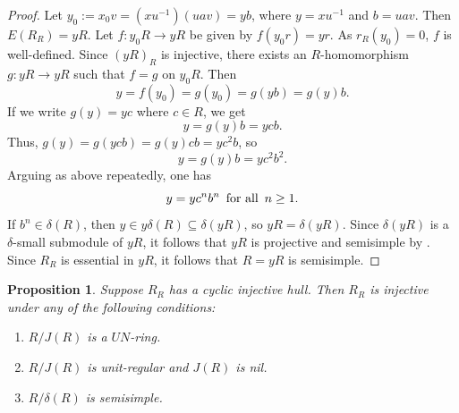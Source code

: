 \documentclass{amsart}
\theoremstyle{plain}
\newtheorem{proposition}[theorem]{Proposition}
\numberwithin{equation}{section}
\begin{document}
\begin{proof}
Let $y_{0}:=x_{0} v =(x u^{ -1}) (u a v) =y b$, where $y =x u^{ -1}$ and $b =u a v$. Then $E (R_{R}) =y R$. Let $f :y_{0} R \rightarrow y R$ be given by $f (y_{0} r) =y r$. As $r_{R} (y_{0}) =0$, $f$ is well-defined. Since $(y R)_{R}$ is injective, there exists an $R$-homomorphism $g :y R \rightarrow y R$ such that $f =g$ on $y_{0} R$. Then
\begin{equation*}y =f (y_{0}) =g (y_{0}) =g (y b) =g (y) b\text{.}
\end{equation*}If we write $g (y) =y c$ where $c \in R$, we get
\begin{equation*}y =g (y) b =y c b\text{.}
\end{equation*}Thus, $g (y) =g (y c b) =g (y) c b =y c^{2} b$, so
\begin{equation*}y =g (y) b =y c^{2} b^{2}\text{.}
\end{equation*}Arguing as above repeatedly, one has
\begin{equation*}y =y c^{n} b^{n}\text{\thinspace \thinspace \thinspace }\text{for all}\text{\thinspace \thinspace \thinspace }n \geq 1.
\end{equation*}If $b^{n} \in \delta  (R)$, then $y \in y \delta  (R) \subseteq \delta  (y R)$, so $y R =\delta  (y R)$. Since $\delta  (y R)$ is a $\delta $-small submodule of $y R$, it follows that $y R$ is projective and semisimple by \cite[Lemma
1.2]{Z}. Since $R_{R}$ is essential in $y R$, it follows that $R =y R$ is semisimple. 
\end{proof}


\begin{proposition}
\label{E(R) cyclic and R/J(R) is a UN-ring implies Injective}
\label{E(R) cyclic implies Injective VII} Suppose $R_{R}$ has a cyclic injective hull. Then $R_{R}$ is injective under any of the following conditions: 


\begin{enumerate}
\item $R/J (R)$ is a $U N$-ring. 

\item $R/J (R)$ is unit-regular and $J (R)$ is nil. 

\item $R/\delta  (R)$ is semisimple. \end{enumerate}
\end{proposition}
\end{document}
